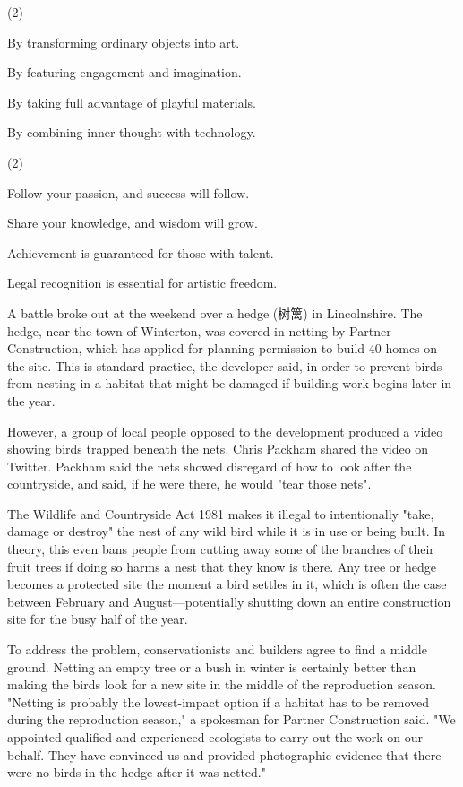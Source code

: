 \documentclass{英语试卷}
\begin{document}
\begin{choices}(2)
  \item By transforming ordinary objects into art.
  \item By featuring engagement and imagination.
  \item By taking full advantage of playful materials.
  \item By combining inner thought with technology.
\end{choices}
\begin{choices}(2)
  \item Follow your passion, and success will follow.
  \item Share your knowledge, and wisdom will grow.
  \item Achievement is guaranteed for those with talent.
  \item Legal recognition is essential for artistic freedom.
\end{choices}
\par A battle broke out at the weekend over a hedge (树篱) in Lincolnshire. The hedge, near the town of Winterton, was covered in netting by Partner Construction, which has applied for planning permission to build 40 homes on the site. This is standard practice, the developer said, in order to prevent birds from nesting in a habitat that might be damaged if building work begins later in the year.\par
\par However, a group of local people opposed to the development produced a video showing birds trapped beneath the nets. Chris Packham shared the video on Twitter. Packham said the nets showed disregard of how to look after the countryside, and said, if he were there, he would "tear those nets".\par
\par The Wildlife and Countryside Act 1981 makes it illegal to intentionally "take, damage or destroy" the nest of any wild bird while it is in use or being built. In theory, this even bans people from cutting away some of the branches of their fruit trees if doing so harms a nest that they know is there. Any tree or hedge becomes a protected site the moment a bird settles in it, which is often the case between February and August—potentially shutting down an entire construction site for the busy half of the year.\par
\par To address the problem, conservationists and builders agree to find a middle ground. Netting an empty tree or a bush in winter is certainly better than making the birds look for a new site in the middle of the reproduction season. "Netting is probably the lowest-impact option if a habitat has to be removed during the reproduction season," a spokesman for Partner Construction said. "We appointed qualified and experienced ecologists to carry out the work on our behalf. They have convinced us and provided photographic evidence that there were no birds in the hedge after it was netted."\par
\end{document}
